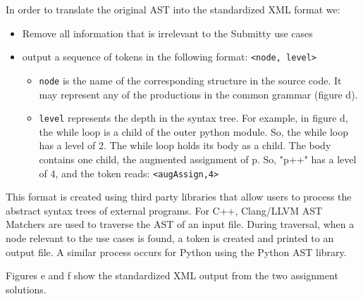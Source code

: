 \documentclass[thesis]{hmcposter}
\begin{document}
\begin{poster}
In order to translate the original AST into the standardized XML format we:
\begin{itemize}
\item Remove all information that is irrelevant to the Submitty use cases 
\item output a sequence of tokens in the following format: \texttt{<node, level>}
	\begin{itemize}
	\item \texttt{node} is the name of the corresponding structure in the source code. It may represent any of the productions in the common grammar (figure d).
	\item \texttt{level} represents the depth in the syntax tree. For example, in figure d, the while loop is a child of the outer python module. So, the while loop has a level of 2. The while loop holds its body as a child. The body contains one child, the augmented assignment of p. So, "p++" has a level of 4, and the token reads: \texttt{<augAssign,4>}
	\end{itemize}
\end{itemize}
\vspace{0.5in}

This format is created using third party libraries that allow users to process the abstract syntax trees of external programs. For C++, Clang/LLVM AST Matchers are used to traverse the AST of an input file. During traversal, when a node relevant to the use cases is found, a token is created and printed to an output file. A similar process occurs for Python using the Python AST library.

Figures e and f show the standardized XML output from the two assignment solutions.

\begin{figure}
\begin{center}
\end{center}
\end{figure}


\end{poster}
\end{document}

